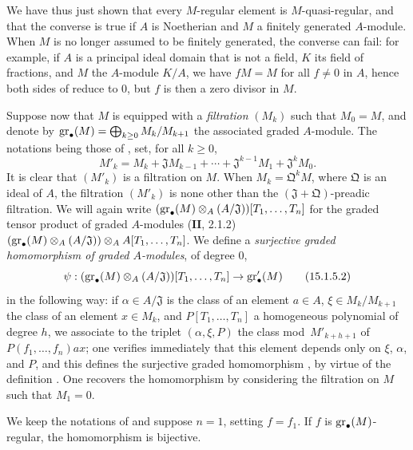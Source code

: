 We have thus just shown that every $M$-regular element is $M$-quasi-regular, and that the converse is true if $A$ is Noetherian and $M$ a finitely generated $A$-module.
When $M$ is no longer assumed to be finitely generated, the converse can fail:
for example, if $A$ is a principal ideal domain that is not a field, $K$ its field of fractions, and $M$ the $A$-module $K/A$, we have $fM=M$ for all $f\neq 0$ in $A$, hence both sides of  reduce to $0$, but $f$ is then a zero divisor in $M$.

\begin{env}[15.1.5]
\label{0.15.1.5}
Suppose now that $M$ is equipped with a \emph{filtration} $(M_k)$ such that $M_0=M$, and denote by $\operatorname{gr}_\bullet(M)=\bigoplus_{k\geq 0}M_k/M_{k+1}$ the associated graded $A$-module.
The notations being those of , set, for all $k\geq 0$,
\[
\label{0.15.1.5.1}
  M'_k = M_k + \mathfrak{J}M_{k-1} + \cdots + \mathfrak{J}^{k-1}M_1 + \mathfrak{J}^k M_0.
\tag{15.1.5.1}
\]
It is clear that $(M'_k)$ is a filtration on $M$.
When $M_k=\mathfrak{Q}^k M$, where $\mathfrak{Q}$ is an ideal of $A$, the filtration $(M'_k)$ is none other than the $(\mathfrak{J}+\mathfrak{Q})$-preadic filtration.
We will again write $(\operatorname{gr}_\bullet(M)\otimes_A(A/\mathfrak{J}))[T_1,\ldots,T_n]$ for the graded tensor product of graded $A$-modules ($\mathbf{II}$, 2.1.2)
$(\operatorname{gr}_\bullet(M)\otimes_A(A/\mathfrak{J}))\otimes_A A[T_1,\ldots,T_n]$.
We define a \emph{surjective graded homomorphism of graded $A$-modules}, of degree $0$,
\[
\label{0.15.1.5.2}
  \psi : (\operatorname{gr}_\bullet(M)\otimes_A(A/\mathfrak{J}))[T_1,\ldots,T_n] \to \operatorname{gr}'_\bullet(M)
\tag{15.1.5.2}
\]
in the following way:
if $\alpha\in A/\mathfrak{J}$ is the class of an element $a\in A$, $\xi\in M_k/M_{k+1}$ the class of an element $x\in M_k$, and $P[T_1,\ldots,T_n]$ a homogeneous polynomial of degree $h$, we associate to the triplet $(\alpha,\xi,P)$ the class mod~$M'_{k+h+1}$ of $P(f_1,\ldots,f_n)ax$;
one verifies immediately that this element depends only on $\xi$, $\alpha$, and $P$, and this defines the surjective graded homomorphism , by virtue of the definition .
One recovers the homomorphism  by considering the filtration on $M$ such that $M_1=0$.
\end{env}

\begin{lemma}[15.1.6]
\label{0.15.1.6}
We keep the notations of  and suppose $n=1$, setting $f=f_1$.
If $f$ is $\operatorname{gr}_\bullet(M)$-regular, the homomorphism  is bijective.
\end{lemma}

